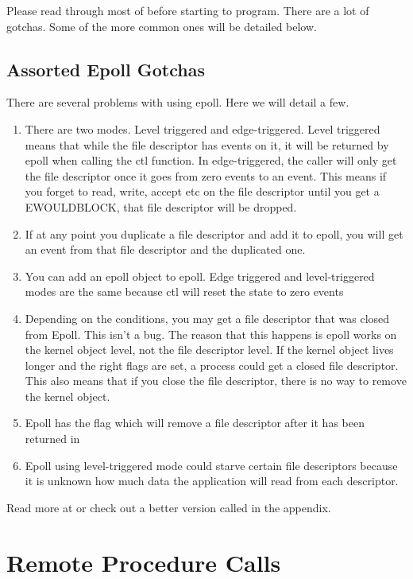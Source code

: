 Please read through most of  before starting to program.
There are a lot of gotchas.
Some of the more common ones will be detailed below.

\subsection{Assorted Epoll Gotchas}

There are several problems with using epoll. Here we will detail a few.

\begin{enumerate}
\item There are two modes. Level triggered and edge-triggered. Level triggered means that while the file descriptor has events on it, it will be returned by epoll when calling the ctl function. In edge-triggered, the caller will only get the file descriptor once it goes from zero events to an event.
  This means if you forget to read, write, accept etc on the file descriptor until you get a EWOULDBLOCK, that file descriptor will be dropped.
\item If at any point you duplicate a file descriptor and add it to epoll, you will get an event from that file descriptor and the duplicated one.
\item You can add an epoll object to epoll. Edge triggered and level-triggered modes are the same because ctl will reset the state to zero events
\item Depending on the conditions, you may get a file descriptor that was closed from Epoll. This isn't a bug. The reason that this happens is epoll works on the kernel object level, not the file descriptor level.
  If the kernel object lives longer and the right flags are set, a process could get a closed file descriptor.
  This also means that if you close the file descriptor, there is no way to remove the kernel object.
\item Epoll has the  flag which will remove a file descriptor after it has been returned in 
\item Epoll using level-triggered mode could starve certain file descriptors because it is unknown how much data the application will read from each descriptor.
\end{enumerate}

Read more at  or check out a better version called  in the appendix.

\section{Remote Procedure Calls}

